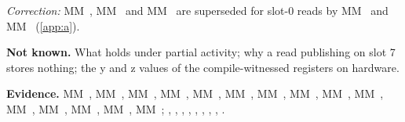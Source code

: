 \emph{Correction:} MM~, MM~ and MM~ are superseded for slot-0 reads by MM~ and
MM~ (\cref{app:a}).

\textbf{Not known.} What  holds under partial activity; why a read publishing on slot 7 stores nothing;
the y and z values of the compile-witnessed registers on hardware.

\textbf{Evidence.} MM~, MM~, MM~, MM~, MM~, MM~, MM~, MM~, MM~, MM~,
MM~, MM~, MM~, MM~, MM~; ,
, , , ,
, , , .
